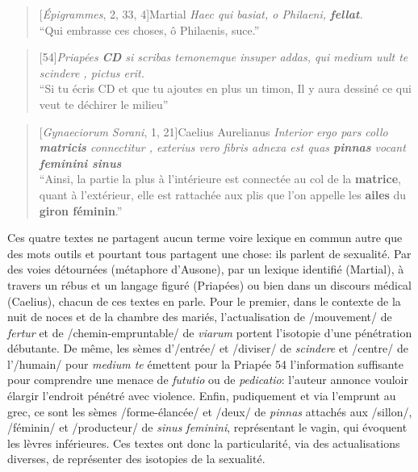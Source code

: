 \begin{quote}[\textit{Épigrammes}, 2, 33, 4]{Martial}
    \textit{Haec qui basiat, o Philaeni, \textbf{fellat}. \\}
    \enquote{Qui embrasse ces choses, ô Philaenis, suce.}
\end{quote}

\begin{quote}[54]{\textit{Priapées}}
    \textit{\textbf{CD} si scribas temonemque insuper addas, qui medium uult te scindere , pictus erit.} \\
    \enquote{Si tu écris CD et que tu ajoutes en plus un timon, Il y aura dessiné ce qui veut te déchirer le milieu}
\end{quote}

\begin{quote}[\textit{Gynaeciorum Sorani}, 1, 21]{Caelius Aurelianus}
    \textit{Interior ergo pars collo \textbf{matricis} connectitur , exterius vero fibris adnexa est quas \textbf{pinnas} vocant \textbf{feminini sinus}} \\
    \enquote{Ainsi, la partie la plus à l'intérieure est connectée au col de la \textbf{matrice}, quant à l'extérieur, elle est rattachée aux plis que l'on appelle les \textbf{ailes} du \textbf{giron féminin}.}
\end{quote}

Ces quatre textes ne partagent aucun terme voire lexique en commun autre que des mots outils et pourtant tous partagent une chose: ils parlent de sexualité. Par des voies détournées (métaphore d'Ausone), par un lexique identifié (Martial), à travers un rébus et un langage figuré (Priapées) ou bien dans un discours médical (Caelius), chacun de ces textes en parle. Pour le premier, dans le contexte de la nuit de noces et de la chambre des mariés, l'actualisation de /mouvement/ de \textit{fertur} et de /chemin-empruntable/ de \textit{viarum} portent l'isotopie d'une pénétration débutante. De même, les sèmes d'/entrée/ et /diviser/ de \textit{scindere} et /centre/ de l'/humain/ pour \textit{medium te} émettent pour la Priapée 54 l'information suffisante pour comprendre une menace de \textit{fututio} ou de \textit{pedicatio}: l'auteur annonce vouloir élargir l'endroit pénétré avec violence. Enfin, pudiquement et via l'emprunt au grec, ce sont les sèmes /forme-élancée/ et /deux/ de \textit{pinnas} attachés aux /sillon/, /féminin/ et /producteur/ de \textit{sinus feminini}, représentant le vagin, qui évoquent les lèvres inférieures. Ces textes ont donc la particularité, via des actualisations diverses, de représenter des isotopies de la sexualité.

